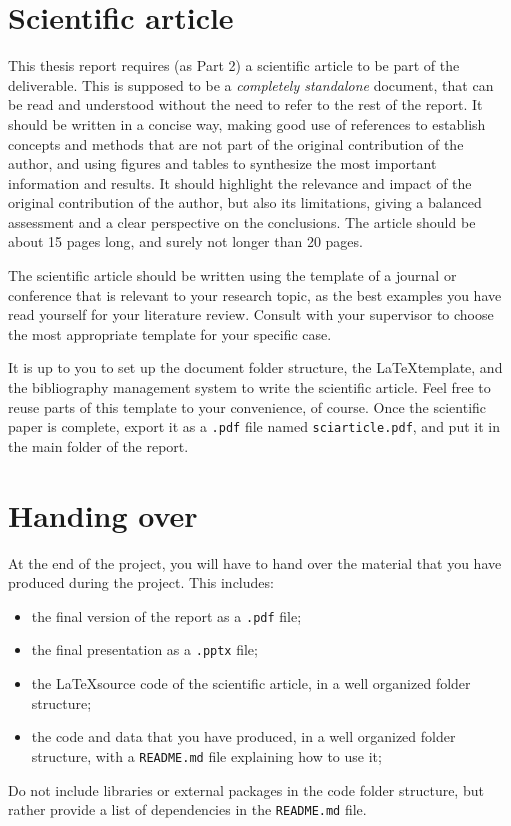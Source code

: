 \section{Scientific article}
This thesis report requires (as Part 2) a scientific article to be part of the deliverable.
This is supposed to be a \emph{completely standalone} document, that can be read and understood without the need to refer to the rest of the report.
It should be written in a concise way, making good use of references to establish concepts and methods that are not part of the original contribution of the author, and using figures and tables to synthesize the most important information and results.
It should highlight the relevance and impact of the original contribution of the author, but also its limitations, giving a balanced assessment and a clear perspective on the conclusions.
The article should be about 15 pages long, and surely not longer than 20 pages.


The scientific article should be written using the template of a journal or conference that is relevant to your research topic, as the best examples you have read yourself for your literature review.
Consult with your supervisor to choose the most appropriate template for your specific case.


It is up to you to set up the document folder structure, the \LaTeX template, and the bibliography management system to write the scientific article.
Feel free to reuse parts of this template to your convenience, of course.
Once the scientific paper is complete, export it as a \texttt{.pdf} file named \texttt{sciarticle.pdf}, and put it in the main folder of the report.




\section{Handing over}
At the end of the project, you will have to hand over the material that you have produced during the project.
This includes:
%
\begin{itemize}
    \item the final version of the report as a \texttt{.pdf} file;
    \item the final presentation as a \texttt{.pptx} file;
    \item the \LaTeX source code of the scientific article, in a well organized folder structure;
    \item the code and data that you have produced, in a well organized folder structure, with a \texttt{README.md} file explaining how to use it;
\end{itemize}
%
Do not include libraries or external packages in the code folder structure, but rather provide a list of dependencies in the \texttt{README.md} file.